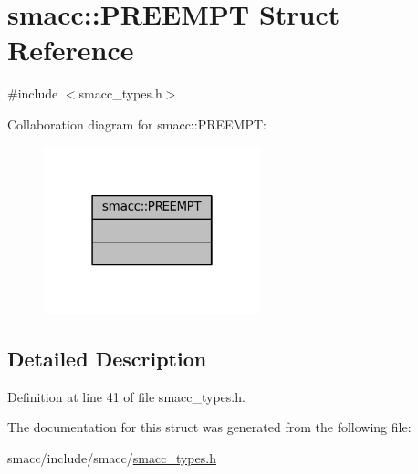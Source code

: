 \hypertarget{structsmacc_1_1PREEMPT}{}\section{smacc\+:\+:P\+R\+E\+E\+M\+PT Struct Reference}
\label{structsmacc_1_1PREEMPT}


{\ttfamily \#include $<$smacc\+\_\+types.\+h$>$}



Collaboration diagram for smacc\+:\+:P\+R\+E\+E\+M\+PT\+:
\nopagebreak
\begin{figure}[H]
\begin{center}
\leavevmode
\includegraphics[width=178pt]{structsmacc_1_1PREEMPT__coll__graph}
\end{center}
\end{figure}


\subsection{Detailed Description}


Definition at line 41 of file smacc\+\_\+types.\+h.



The documentation for this struct was generated from the following file\+:\begin{DoxyCompactItemize}
\item 
smacc/include/smacc/\hyperlink{smacc__types_8h}{smacc\+\_\+types.\+h}\end{DoxyCompactItemize}
